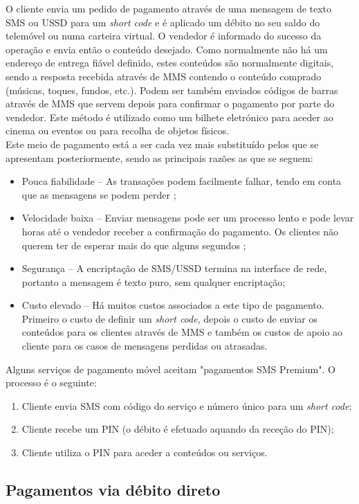 O cliente envia um pedido de pagamento através de uma mensagem de texto SMS ou USSD para um \textit{short code} e é aplicado um débito no seu saldo do telemóvel ou numa carteira virtual. O vendedor é informado do sucesso da operação e envia então o conteúdo desejado.\cite{Blervaque2003} Como normalmente não há um endereço de entrega fiável definido, estes conteúdos são normalmente digitais, sendo a resposta recebida através de MMS contendo o conteúdo comprado (músicas, toques, fundos, etc.). Podem ser também enviados códigos de barras através de MMS que servem depois para confirmar o pagamento por parte do vendedor. Este método é utilizado como um bilhete eletrónico para aceder ao cinema ou eventos ou para recolha de objetos físicos.
\\Este meio de pagamento está a ser cada vez mais substituído pelos que se apresentam posteriormente, sendo as principais razões as que se seguem:
\begin{itemize}
\item Pouca fiabilidade – As transações podem facilmente falhar, tendo em conta que as mensagens se podem perder \cite{innopay};
\item Velocidade baixa – Enviar mensagens pode ser um processo lento e pode levar horas até o vendedor receber a confirmação do pagamento. Os clientes não querem ter de esperar mais do que alguns segundos \cite{Mallat2007};
\item Segurança – A encriptação de SMS/USSD termina na interface de rede, portanto a mensagem é texto puro, sem qualquer encriptação;
\item Custo elevado – Há muitos custos associados a este tipo de pagamento. Primeiro o custo de definir um \textit{short code}, depois o custo de enviar os conteúdos para os clientes através de MMS e também os custos de apoio ao cliente para os casos de mensagens perdidas ou atrasadas.
\end{itemize} 
Alguns serviços de pagamento móvel aceitam "pagamentos SMS Premium"\cite{mobile}. O processo é o seguinte:
\begin{enumerate}
\item Cliente envia SMS com código do serviço e número único para um \textit{short code};
\item Cliente recebe um PIN (o débito é efetuado aquando da receção do PIN);
\item Cliente utiliza o PIN para aceder a conteúdos ou serviços.
\end{enumerate}

\subsection{Pagamentos via débito direto} \label{direto}

